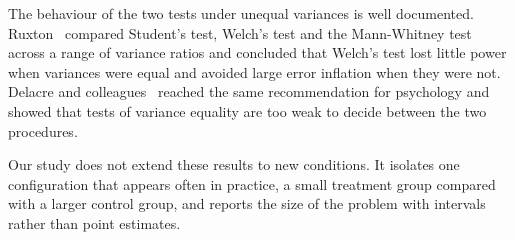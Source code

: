 The behaviour of the two tests under unequal variances is well documented. Ruxton~\citep{ruxton2006unequal} compared Student's test, Welch's test and the Mann-Whitney test across a range of variance ratios and concluded that Welch's test lost little power when variances were equal and avoided large error inflation when they were not. Delacre and colleagues~\citep{delacre2017why} reached the same recommendation for psychology and showed that tests of variance equality are too weak to decide between the two procedures.

Our study does not extend these results to new conditions. It isolates one configuration that appears often in practice, a small treatment group compared with a larger control group, and reports the size of the problem with intervals rather than point estimates.

